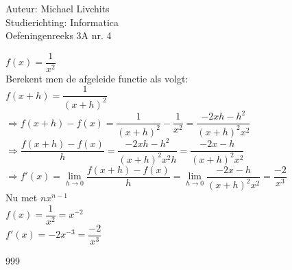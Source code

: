 \documentclass[a4paper]{article}
\begin{document}
  
\noindent \large Auteur: Michael Livchits \\
\noindent \large Studierichting: Informatica\\
\noindent \large Oefeningenreeks 3A nr. 4\\

\medskip

\normalsize

$f(x) = \dfrac{1}{x^2}$\\

Berekent men de afgeleide functie als volgt:\\

$f(x+h) = \dfrac{1}{(x+h)^2} $\\

$\Rightarrow f(x+h)-f(x) = \dfrac{1}{(x+h)^2} - \dfrac{1}{x^2} = \dfrac{-2xh-h^2}{(x+h)^2x^2}$\\

$\Rightarrow \dfrac{f(x+h)-f(x)}{h} = \dfrac{-2xh-h^2}{(x+h)^2x^2h} = \dfrac{-2x-h}{(x+h)^2x^2}$\\

$\Rightarrow f'(x)=\lim\limits_{h\rightarrow 0}\dfrac{f(x+h)-f(x)}{h} = \lim\limits_{h\rightarrow 0}\dfrac{-2x-h}{(x+h)^2x^2} = \dfrac{-2}{x^3}$ \\

Nu met $nx^{n-1}$\\

$f(x) = \dfrac{1}{x^2} = x^{-2}$\\

$f'(x) = -2x^{-3} = \dfrac{-2}{x^3}$\\

\begin{thebibliography}{999}
\end{thebibliography}
\end{document}
